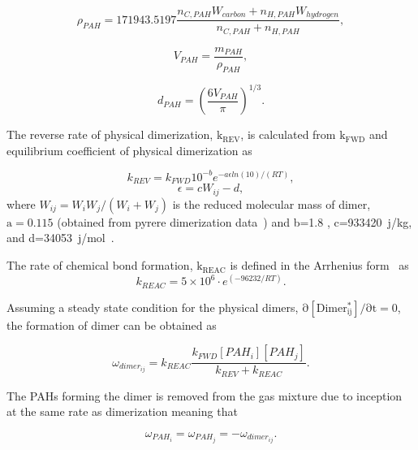 \begin{equation}
	\rho_{PAH} = 
	171943.5197\frac{n_{C,PAH}W_{carbon}+n_{H,PAH}W_{hydrogen}}{n_{C,PAH}+n_{H,PAH}}
	\label{eqn:PAHrho},
\end{equation}

\begin{equation}
	V_{PAH} =
	\frac{m_{PAH}}{\rho_{PAH}}
	\label{eqn:PAHvolume},
\end{equation}

\begin{equation}
	d_{PAH} = 
	\left(
	\frac{6V_{PAH}}{\pi}
	\right)^{1/3}
	\label{eqn:PAHdiameter}.
\end{equation}


The reverse rate of physical dimerization, $\mathrm{k_{REV}}$, is calculated from $\mathrm{k_{FWD}}$ and equilibrium coefficient of physical dimerization as

\begin{equation}
	k_{REV} = k_{FWD}10^{-b}e^{-a\epsilon ln(10)/(RT)}
	\label{eqn:kREV},
\end{equation}
\begin{equation}
	\epsilon = cW_{ij} -d
	\label{eqn:epsilon},
\end{equation}
\noindent where $W_{ij}=W_iW_j/(W_i+W_j)$ is the reduced molecular mass of dimer, $\mathrm{a=0.115}$ (obtained from pyrere dimerization data~\cite{sabbah2010exploring}) and b=1.8 \cite{kholghy2018reactive}, c=933420~j/kg, and d=34053~j/mol~\cite{kholghy2018reactive}. 

The rate of chemical bond formation, $\mathrm{k_{REAC}}$ is defined in the Arrhenius form~\cite{naseri2022simulating} as
\begin{equation}
	k_{REAC} = 5\times10^6\cdot e^{(-96232/RT)}
	\label{eqn:kREAC}.
\end{equation}

Assuming a steady state condition for the physical dimers, $\mathrm{\partial [Dimer^*_{ij}]/\partial t=0}$, the formation of dimer can be obtained as

\begin{equation}
	\omega_{dimer_{ij}} = k_{REAC}\frac{k_{FWD}[PAH_i][PAH_j]}{k_{REV}+k_{REAC}}
	\label{eqn:ropdimer}.
\end{equation}

The PAHs forming the dimer is removed from the gas mixture due to inception at the same rate as dimerization meaning that

\begin{equation}
	\omega_{PAH_{i}} = \omega_{PAH_{j}} = - \omega_{dimer_{ij}}
	\label{eqn:ropdimer}.
\end{equation}


